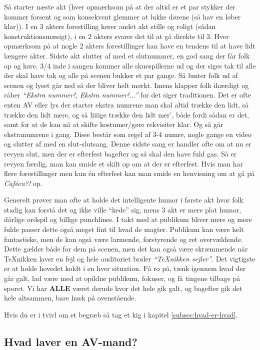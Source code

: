 \documentclass[10pt,a4paper,danish]{article}
\begin{document}
Så starter næste akt (hver opmærksom på at der altid er et par stykker der
kommer forsent og som konsekvent glemmer at lukke dørene (så hav en løber
klar)). I en 3 akters forestilling kører andet akt stille og roligt (sådan
konstruktionsmæsigt), i en 2 akters svarer det til at gå direkte til 3.
Hver opmærksom på at nogle 2 akters forestillinger kan have en tendens til at
have lidt længere akter. Sidste akt slutter af med et slutnummer, en god sang
der får folk op og køre. 3/4 inde i sangen kommer alle skuespillerne ud og der
siges tak til alle der skal have tak og alle på scenen bukker et par gange.
Så lunter folk ud af scenen og lyset går ned så der bliver helt mørkt. Imens
klapper folk ihærdigt og råber \textit{``Ekstra nummer!, Ekstra nummer!...''}
for det siger traditionen. Det er ofte enten AV eller lys der starter ekstra
numrene man skal altid trække den lidt, så trække den lidt mere, og så liiiige
trække den lidt mer', både fordi sådan er det, samt for at de kan nå at skifte
kostumer/gøre rekvisiter klar. Og så går ekstranumrene i gang.
Disse består som regel af 3-4 numre, nogle gange en video og slutter af med en
slut-slutsang. Denne sidste sang er handler ofte om at nu er revyen slut, men
der er efterfest bagefter og så skal den have fuld gas.
Så er revyen færdig, man kan smide et skilt op om at der er efterfest. Hvis man
har flere forestillinger men kun én efterfest kan man smide en henvisning om at
gå på \textit{Caféen?!} op.


Generelt prøver man ofte at holde det intelligente humor i første akt hvor folk
stadig kan forstå det og ikke ville ``kede'' sig, mens 3 akt er mere plat humor,
dårlige ordspil og billige punchlines. I takt med at publikum bliver mere og
mere fulde passer dette også meget fint til hvad de magter.
Publikum kan være helt fantastiske, men de kan også være larmende, forstyrende
og ret overvældende. Dette gælder både for dem på scenen, men det kan også være
skræmmende når \TeX{}nikken laver en fejl og hele auditoriet brøler
\textit{``TeXnikken sejler''}. Det vigtigste er at holde hovedet koldt i en hver
situation. Få ro på, tænk igennem hvad der går galt, lad være med at opildne
publikum, fokuser, og få tingene tilbage på sporet.
Vi har \textbf{ALLE} været derude hvor det hele gik galt, og bagefter gik det
hele altsammen, bare husk på ovenstående.

Hvis du er i tvivl om et begræb så tag et kig i kapitel \ref{subsec:hvad-er-hvad}.

\subsection{Hvad laver en AV-mand?}
\end{document}
